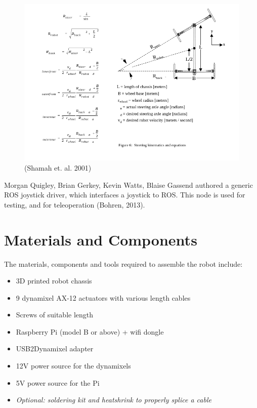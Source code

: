 \documentclass[]{article}
\begin{document}
\begin{figure}[H]
\includegraphics[width=\textwidth]{report_images/shamah.png}
\caption{(Shamah et. al. 2001)}
\end{figure}
Morgan Quigley, Brian Gerkey, Kevin Watts, Blaise Gassend authored a generic ROS joystick driver, which interfaces a joystick to ROS. This node is used for testing, and for teleoperation (Bohren, 2013).

\section{Materials and Components}
The materials, components and tools required to assemble the robot include:
\begin{itemize}
  \item 3D printed robot chassis
  \item 9 dynamixel AX-12 actuators with various length cables
  \item Screws of suitable length
  \item Raspberry Pi (model B or above) + wifi dongle
  \item USB2Dynamixel adapter
  \item 12V power source for the dynamixels
  \item 5V power source for the Pi
  \item \textit{Optional: soldering kit and heatshrink to properly splice a cable}
\end{itemize}
\end{document}
